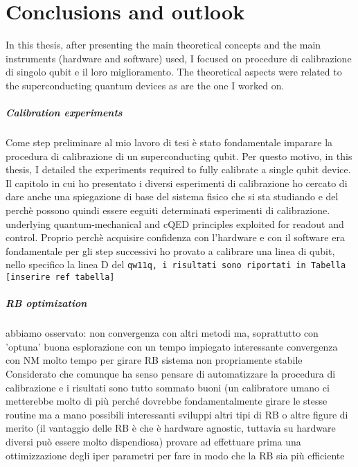 \chapter{Conclusions and outlook}


In this thesis, after presenting the main theoretical concepts and the main instruments (hardware and software) used, I focused on procedure di calibrazione di singolo qubit e il loro miglioramento.
The theoretical aspects were related to the superconducting quantum devices as are the one I worked on.

\paragraph{Calibration experiments}
Come step preliminare al mio lavoro di tesi è stato fondamentale imparare la procedura di calibrazione di un superconducting qubit.
Per questo motivo, in this thesis, I detailed the experiments required to fully calibrate a single qubit device.
Il capitolo in cui ho presentato i diversi esperimenti di calibrazione ho cercato di dare anche una spiegazione di base del sistema fisico che si sta studiando e del perchè possono quindi essere eeguiti determinati esperimenti di calibrazione.
underlying quantum-mechanical and cQED principles exploited for readout and control.
Proprio perchè acquisire confidenza con l'hardware e con il software era fondamentale per gli step successivi ho provato a calibrare una linea di qubit, nello specifico la linea D del \tt{qw11q}, i risultati sono riportati in Tabella [inserire ref tabella]


\paragraph{RB optimization}
abbiamo osservato:
non convergenza con altri metodi ma, soprattutto con 'optuna' buona esplorazione con un tempo impiegato interessante
convergenza con NM
molto tempo per girare RB
sistema non propriamente stabile 
Considerato che comunque ha senso pensare di automatizzare la procedura di calibrazione e i risultati sono tutto sommato buoni (un calibratore umano ci metterebbe molto di più perché dovrebbe fondamentalmente girare le stesse routine ma a mano
possibili interessanti sviluppi
altri tipi di RB o altre figure di merito (il vantaggio delle RB è che è hardware agnostic, tuttavia su hardware diversi può essere molto dispendiosa)
provare ad effettuare prima una ottimizzazione degli iper parametri per fare in modo che la RB sia più efficiente




